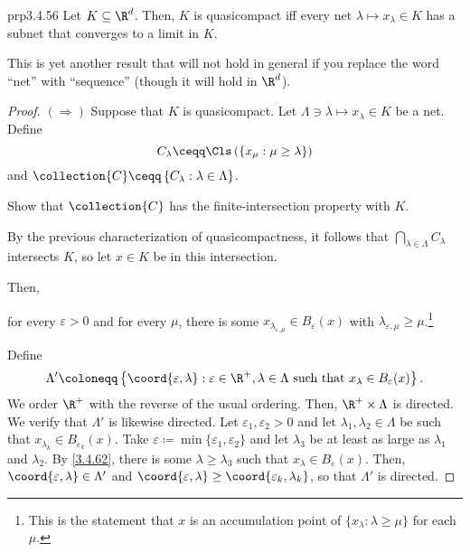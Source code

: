 \begin{thm}{}{prp3.4.56}
Let $K\subseteq \R ^d$.  Then, $K$ is quasicompact iff every net $\lambda \mapsto x_\lambda \in K$ has a subnet that converges to a limit in $K$.
\begin{rmk}
This is yet another result that will not hold in general if you replace the word ``net'' with ``sequence'' (though it will hold in $\R ^d$).
\end{rmk}
\begin{proof}
$(\Rightarrow )$ Suppose that $K$ is quasicompact.  Let $\Lambda \ni \lambda \mapsto x_\lambda \in K$ be a net.  Define
\begin{equation}
C_\lambda \ceqq \Cls \left( \left\{ x_\mu :\mu \geq \lambda \right\} \right) 
\end{equation}
and $\collection{C}\ceqq \left\{ C_\lambda :\lambda \in \Lambda \right\}$.
\begin{exr}[breakable=false]{}{}
Show that $\collection{C}$ has the finite-intersection property with $K$.
\end{exr}
By the previous characterization of quasicompactness, it follows that $\bigcap _{\lambda \in \Lambda}C_\lambda$ intersects $K$, so let $x\in K$ be in this intersection.

Then,
\begin{textequation}[3.4.62]
for every $\varepsilon >0$ and for every $\mu$, there is some $x_{\lambda _{\varepsilon ,\mu}}\in B_\varepsilon (x)$ with $\lambda _{\varepsilon ,\mu}\geq \mu$.\footnote{This is the statement that $x$ is an accumulation point of $\{ x_{\lambda}:\lambda \geq \mu \}$ for each $\mu$.}
\end{textequation}
Define
\begin{equation}
\Lambda '\coloneqq \left\{ \coord{\varepsilon ,\lambda}:\varepsilon \in \R ^+,\lambda \in \Lambda \text{ such that }x_\lambda \in B_{\varepsilon}(x)\right\} .
\end{equation}
We order $\R ^+$ with the reverse of the usual ordering.  Then, $\R ^+\times \Lambda$ is directed.  We verify that $\Lambda '$ is likewise directed.  Let $\varepsilon _1,\varepsilon _2>0$ and let $\lambda _1,\lambda _2\in \Lambda$ be such that $x_{\lambda _k}\in B_{\varepsilon _k}(x)$.  Take $\varepsilon \coloneqq \min \{ \varepsilon _1,\varepsilon _2\}$ and let $\lambda _3$ be at least as large as $\lambda _1$ and $\lambda _2$.  By \eqref{3.4.62}, there is some $\lambda \geq \lambda _3$ such that $x_\lambda \in B_\varepsilon (x)$.  Then, $\coord{\varepsilon ,\lambda}\in \Lambda '$ and $\coord{\varepsilon ,\lambda}\geq \coord{\varepsilon _k,\lambda _k}$, so that $\Lambda '$ is directed.


\end{proof}
\end{thm}
